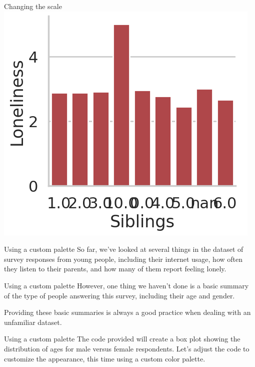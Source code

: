 \documentclass[
  ignorenonframetext,
]{beamer}
\begin{document}
\begin{frame}{Changing the scale}
\label{changing-the-scale-16}
\includegraphics{../images/im302.png}
\end{frame}

\begin{frame}{Using a custom palette}
\label{using-a-custom-palette}
So far, we've looked at several things in the dataset of survey
responses from young people, including their internet usage, how often
they listen to their parents, and how many of them report feeling
lonely.
\end{frame}

\begin{frame}{Using a custom palette}
\label{using-a-custom-palette-1}
However, one thing we haven't done is a basic summary of the type of
people answering this survey, including their age and gender.

Providing these basic summaries is always a good practice when dealing
with an unfamiliar dataset.
\end{frame}

\begin{frame}{Using a custom palette}
\label{using-a-custom-palette-2}
The code provided will create a box plot showing the distribution of
ages for male versus female respondents. Let's adjust the code to
customize the appearance, this time using a custom color palette.
\end{frame}
\end{document}
